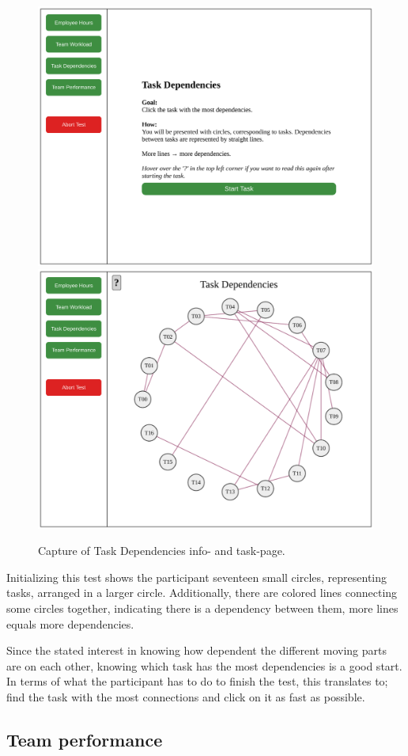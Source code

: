 {    \begin{figure}[h!]
      \centering
      \includegraphics[width=.49\textwidth]{figures/captures/webapp_dependencies_info.pdf}
      \includegraphics[width=.49\textwidth]{figures/captures/webapp_dependencies_task.pdf}
      \caption{Capture of Task Dependencies info- and task-page.}
    \end{figure}

    Initializing this test shows the participant seventeen small circles,
    representing tasks, arranged in a larger circle. Additionally, there are
    colored lines connecting some circles together, indicating there is
    a dependency between them, more lines equals more dependencies.

    Since the stated interest in knowing how dependent the different
    moving parts are on each other, knowing which task has the most
    dependencies is a good start. In terms of what the participant has to
    do to finish the test, this translates to; find the task with the most
    connections and click on it as fast as possible.

    \newpage
    \subsection{Team performance}

}

